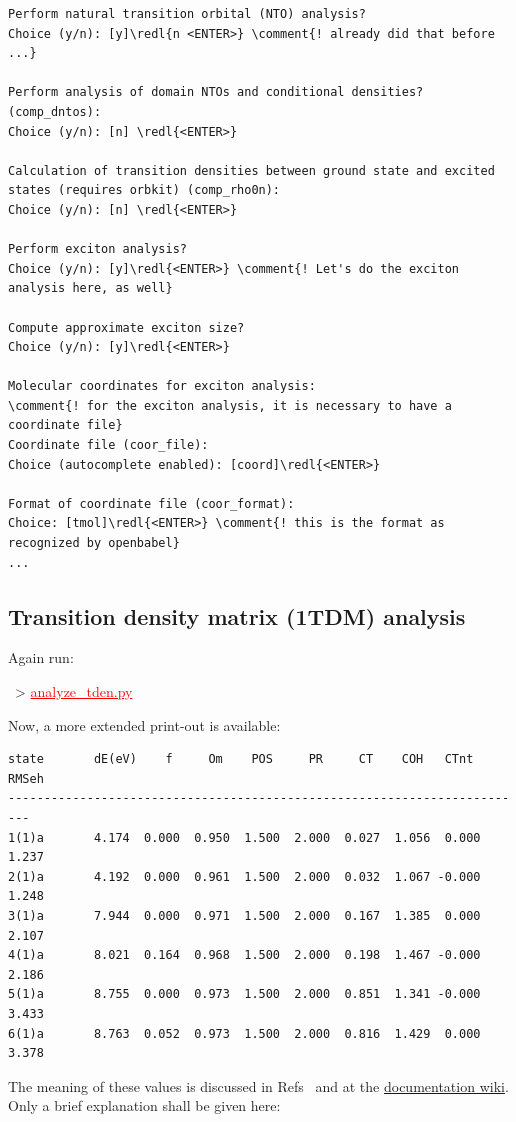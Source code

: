 \documentclass[DIV=12,headings=normal]{scrartcl}
\newcommand{\comment}[1]{\textcolor{blue}{#1}}
\newcommand{\redl}[1]{{\textcolor{red}{\underline{#1}}}}
\newcommand{\comm}[1]{
\small
~> \redl{#1}
\normalsize
}
\begin{document}
\begin{Verbatim}[commandchars=\\\{\}]
Perform natural transition orbital (NTO) analysis?
Choice (y/n): [y]\redl{n <ENTER>} \comment{! already did that before ...}

Perform analysis of domain NTOs and conditional densities? (comp_dntos):
Choice (y/n): [n] \redl{<ENTER>}

Calculation of transition densities between ground state and excited states (requires orbkit) (comp_rho0n):
Choice (y/n): [n] \redl{<ENTER>}

Perform exciton analysis?
Choice (y/n): [y]\redl{<ENTER>} \comment{! Let's do the exciton analysis here, as well}

Compute approximate exciton size?
Choice (y/n): [y]\redl{<ENTER>}

Molecular coordinates for exciton analysis:
\comment{! for the exciton analysis, it is necessary to have a coordinate file}
Coordinate file (coor_file):
Choice (autocomplete enabled): [coord]\redl{<ENTER>}

Format of coordinate file (coor_format):
Choice: [tmol]\redl{<ENTER>} \comment{! this is the format as recognized by openbabel}
...
\end{Verbatim}
\normalsize
%
\subsection{Transition density matrix (1TDM) analysis}

Again run:

\comm{analyze\_tden.py}

Now, a more extended print-out is available:

\scriptsize
\begin{Verbatim}[commandchars=\\\{\}]
state       dE(eV)    f     Om    POS     PR     CT    COH   CTnt  RMSeh
-------------------------------------------------------------------------
1(1)a       4.174  0.000  0.950  1.500  2.000  0.027  1.056  0.000  1.237
2(1)a       4.192  0.000  0.961  1.500  2.000  0.032  1.067 -0.000  1.248
3(1)a       7.944  0.000  0.971  1.500  2.000  0.167  1.385  0.000  2.107
4(1)a       8.021  0.164  0.968  1.500  2.000  0.198  1.467 -0.000  2.186
5(1)a       8.755  0.000  0.973  1.500  2.000  0.851  1.341 -0.000  3.433
6(1)a       8.763  0.052  0.973  1.500  2.000  0.816  1.429  0.000  3.378
\end{Verbatim}
\normalsize

The meaning of these values is discussed in Refs~\cite{DMAT, DMAT_ADC_II} and at the \href{https://sourceforge.net/p/theodore-qc/wiki/Transition density matrix analysis/}{documentation wiki}. Only a brief explanation shall be given here:
\end{document}
